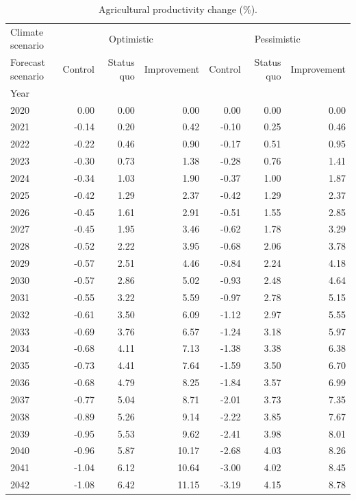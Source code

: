 \begin{table}
\caption{Agricultural productivity change (\%).}
\label{tab:agri_impact_channel_KHM}
\centering
\begin{tabular}{lrrrrrr}
\toprule
Climate scenario & \multicolumn{3}{c}{Optimistic} & \multicolumn{3}{c}{Pessimistic} \\
Forecast scenario & Control & Status quo & Improvement & Control & Status quo & Improvement \\
Year &  &  &  &  &  &  \\
\midrule
2020 & 0.00 & 0.00 & 0.00 & 0.00 & 0.00 & 0.00 \\
2021 & -0.14 & 0.20 & 0.42 & -0.10 & 0.25 & 0.46 \\
2022 & -0.22 & 0.46 & 0.90 & -0.17 & 0.51 & 0.95 \\
2023 & -0.30 & 0.73 & 1.38 & -0.28 & 0.76 & 1.41 \\
2024 & -0.34 & 1.03 & 1.90 & -0.37 & 1.00 & 1.87 \\
2025 & -0.42 & 1.29 & 2.37 & -0.42 & 1.29 & 2.37 \\
2026 & -0.45 & 1.61 & 2.91 & -0.51 & 1.55 & 2.85 \\
2027 & -0.45 & 1.95 & 3.46 & -0.62 & 1.78 & 3.29 \\
2028 & -0.52 & 2.22 & 3.95 & -0.68 & 2.06 & 3.78 \\
2029 & -0.57 & 2.51 & 4.46 & -0.84 & 2.24 & 4.18 \\
2030 & -0.57 & 2.86 & 5.02 & -0.93 & 2.48 & 4.64 \\
2031 & -0.55 & 3.22 & 5.59 & -0.97 & 2.78 & 5.15 \\
2032 & -0.61 & 3.50 & 6.09 & -1.12 & 2.97 & 5.55 \\
2033 & -0.69 & 3.76 & 6.57 & -1.24 & 3.18 & 5.97 \\
2034 & -0.68 & 4.11 & 7.13 & -1.38 & 3.38 & 6.38 \\
2035 & -0.73 & 4.41 & 7.64 & -1.59 & 3.50 & 6.70 \\
2036 & -0.68 & 4.79 & 8.25 & -1.84 & 3.57 & 6.99 \\
2037 & -0.77 & 5.04 & 8.71 & -2.01 & 3.73 & 7.35 \\
2038 & -0.89 & 5.26 & 9.14 & -2.22 & 3.85 & 7.67 \\
2039 & -0.95 & 5.53 & 9.62 & -2.41 & 3.98 & 8.01 \\
2040 & -0.96 & 5.87 & 10.17 & -2.68 & 4.03 & 8.26 \\
2041 & -1.04 & 6.12 & 10.64 & -3.00 & 4.02 & 8.45 \\
2042 & -1.08 & 6.42 & 11.15 & -3.19 & 4.15 & 8.78 \\

\end{tabular}
\end{table}
